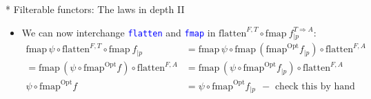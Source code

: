 \documentclass[english]{beamer}
\begin{document}
\begin{frame}{{*} Filterable functors: The laws in depth II}
\begin{itemize}
{\begin{align*}
\text{fmap}\,(\text{fmap}^{\text{Opt}}f^{T\Rightarrow A})\circ\text{flatten}^{F,A} & =\text{flatten}^{F,T}\circ\text{fmap}\,f\ \ -\text{ \textbf{law 1 for flatten}}
\end{align*}
}{\footnotesize \par}
\item We can now interchange \texttt{\textcolor{blue}{\footnotesize{}flatten}}
and \texttt{\textcolor{blue}{\footnotesize{}fmap}} in $\text{flatten}^{F,T}\circ\text{fmap}\:f_{|p}^{T\Rightarrow A}$:{\footnotesize{}
\begin{align*}
\text{fmap}\,\psi\circ\text{flatten}^{F,T}\circ\text{fmap}\:f_{|p} & =\text{fmap}\,\psi\circ\text{fmap}\,(\text{fmap}^{\text{Opt}}f_{|p})\circ\text{flatten}^{F,A}\\
=\text{fmap}\,(\psi\circ\text{fmap}^{\text{Opt}}f)\circ\text{flatten}^{F,A} & =\text{fmap}\,(\psi\circ\text{fmap}^{\text{Opt}}f_{|p})\circ\text{flatten}^{F,A}\\
\psi\circ\text{fmap}^{\text{Opt}}f & =\psi\circ\text{fmap}^{\text{Opt}}f_{|p}\ \ -\text{ check this by hand}
\end{align*}
}{\footnotesize \par}
\end{itemize}
\end{frame}
\end{document}
